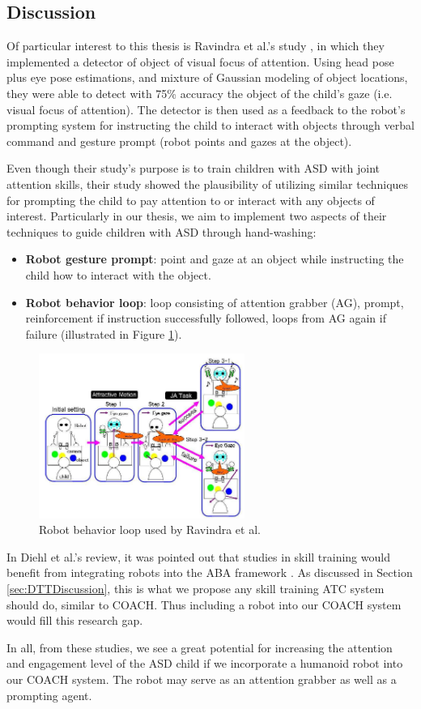 \subsection{Discussion}
Of particular interest to this thesis is Ravindra et al.'s study \cite{ravindra2009therapeutic}, in which they implemented a detector of object of visual focus of attention.  Using head pose plus eye pose estimations, and mixture of Gaussian modeling of object locations, they were able to detect with 75\% accuracy the object of the child's gaze (i.e. visual focus of attention).  The detector is then used as a feedback to the robot's prompting system for instructing the child to interact with objects through verbal command and gesture prompt (robot points and gazes at the object).


Even though their study's purpose is to train children with ASD with joint attention skills, their study showed the plausibility of utilizing similar techniques for prompting the child to pay attention to or interact with any objects of interest.  Particularly in our thesis, we aim to implement two aspects of their techniques to guide children with ASD through hand-washing:
\begin{itemize}
	\item \textbf{Robot gesture prompt}: point and gaze at an object while instructing the child how to interact with the object.
	\item \textbf{Robot behavior loop}: loop consisting of attention grabber (AG), prompt, reinforcement if instruction successfully followed, loops from AG again if failure (illustrated in Figure \ref{fig:ravindra2009therapeutic}).
\end{itemize}
\begin{figure} [H]
	\centering
	\includegraphics[width=0.6\textwidth]{./img/ravindra2009therapeutic.png}
	\caption{Robot behavior loop used by Ravindra et al. \cite{ravindra2009therapeutic}}
	\label{fig:ravindra2009therapeutic}
\end{figure}

In Diehl et al.'s review, it was pointed out that studies in skill training would benefit from integrating robots into the ABA framework \cite{diehl2012clinical}.  As discussed in Section \ref{sec:DTTDiscussion}, this is what we propose any skill training ATC system should do, similar to COACH.  Thus including a robot into our COACH system would fill this research gap.


In all, from these studies, we see a great potential for increasing the attention and engagement level of the ASD child if we incorporate a humanoid robot into our COACH system.  The robot may serve as an attention grabber as well as a prompting agent.
